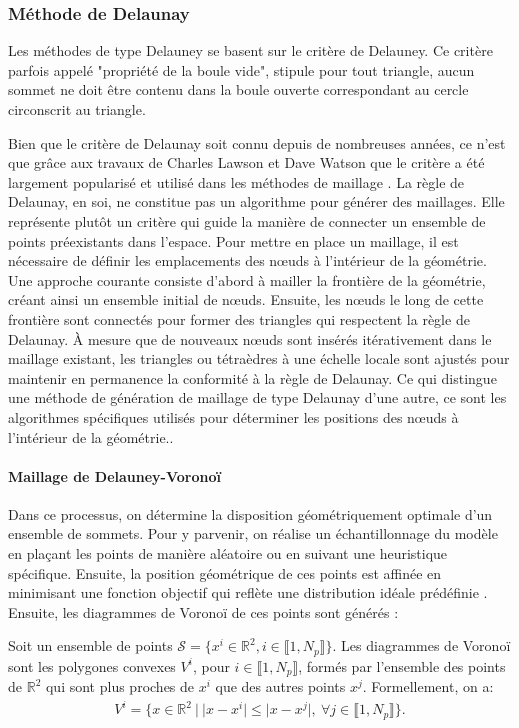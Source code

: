 \subsubsection{Méthode de Delaunay}
Les méthodes de type Delauney se basent sur le critère de Delauney. Ce critère parfois appelé "propriété de la boule vide", stipule pour tout triangle, aucun sommet ne doit être contenu dans la boule ouverte correspondant au cercle circonscrit au triangle.

Bien que le critère de Delaunay soit connu depuis de nombreuses années, ce n'est que grâce aux travaux de Charles Lawson et Dave Watson que le critère a été largement popularisé et utilisé dans les méthodes de maillage \cite{owen1998survey}. La règle de Delaunay, en soi, ne constitue pas un algorithme pour générer des maillages. Elle représente plutôt un critère qui guide la manière de connecter un ensemble de points préexistants dans l'espace. Pour mettre en place un maillage, il est nécessaire de définir les emplacements des nœuds à l'intérieur de la géométrie. Une approche courante consiste d'abord à mailler la frontière de la géométrie, créant ainsi un ensemble initial de nœuds. Ensuite, les nœuds le long de cette frontière sont connectés pour former des triangles qui respectent la règle de Delaunay. À mesure que de nouveaux nœuds sont insérés itérativement dans le maillage existant, les triangles ou tétraèdres à une échelle locale sont ajustés pour maintenir en permanence la conformité à la règle de Delaunay. Ce qui distingue une méthode de génération de maillage de type Delaunay d'une autre, ce sont les algorithmes spécifiques utilisés pour déterminer les positions des nœuds à l'intérieur de la géométrie.\cite{owen1998survey}.

\paragraph{Maillage de Delauney-Voronoï}
Dans ce processus, on détermine la disposition géométriquement optimale d'un ensemble de sommets. Pour y parvenir, on réalise un échantillonnage du modèle en plaçant les points de manière aléatoire ou en suivant une heuristique spécifique. Ensuite, la position géométrique de ces points est affinée en minimisant une fonction objectif qui reflète une distribution idéale prédéfinie \cite{botella2016generation}. Ensuite, les diagrammes de Voronoï de ces points sont générés :

\begin{definition}
Soit un ensemble de points $\mathcal{S}=\{x^i\in\mathbb{R}^2, i\in\llbracket 1, N_p\rrbracket\}$. Les diagrammes de Voronoï sont les polygones convexes $V^i$, pour $i\in\llbracket 1, N_p\rrbracket$, formés par l’ensemble des points de $\mathbb{R}^2$ qui sont plus proches de $x^i$ que des autres points $x^j$. Formellement, on a:
\begin{eqnarray}
V^i=\{x\in\mathbb{R}^2\ |\ |x-x^i|\leq|x-x^j|,\ \forall j\in\llbracket 1, N_p\rrbracket\}.
\end{eqnarray}
\end{definition}

